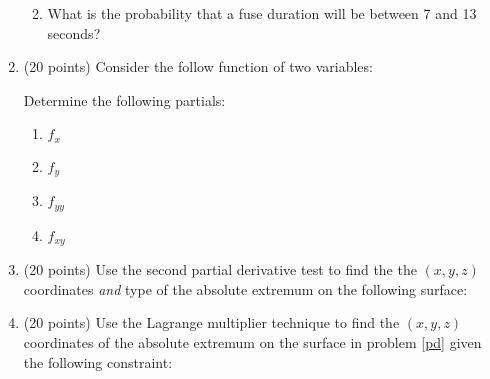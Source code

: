 \documentclass[letterpaper,12pt,fleqn]{article}
\begin{document}
\begin{enumerate}[left=0pt]
\begin{enumerate}
    \vspace{1in}
    
  \item What is the probability that a fuse duration will be between 7 and 13 seconds?
  \end{enumerate}

  \newpage

\item (20 points) Consider the follow function of two variables:

  \bigskip

  \begin{center}
  \end{center}
  
  \bigskip

  Determine the following partials:
  \begin{enumerate}[label={\alph*)}]
  \item \(f_x\)

    \vspace{3in}
    
  \item \(f_y\)

    \vspace{1in}

  \item \(f_{yy}\)

    \vspace{1in}

  \item \(f_{xy}\)
  \end{enumerate}

  \newpage

\item\label{pd} (20 points) Use the second partial derivative test to find the the \((x,y,z)\) coordinates
  \emph{and} type of the absolute extremum on the following surface:

  \bigskip

  \begin{center}
    \scalebox{1.25}{\(\displaystyle z=x^2+4x+y^2-2y+10\)}
  \end{center}

  \bigskip

  \newpage

\item (20 points) Use the Lagrange multiplier technique to find the \((x,y,z)\) coordinates of the absolute
  extremum on the surface in problem \ref{pd} given the following constraint:

  \bigskip

  \begin{center}
    \scalebox{1.25}{\(\displaystyle 2x-y=0\)}
  \end{center}
\end{enumerate}
\end{document}

